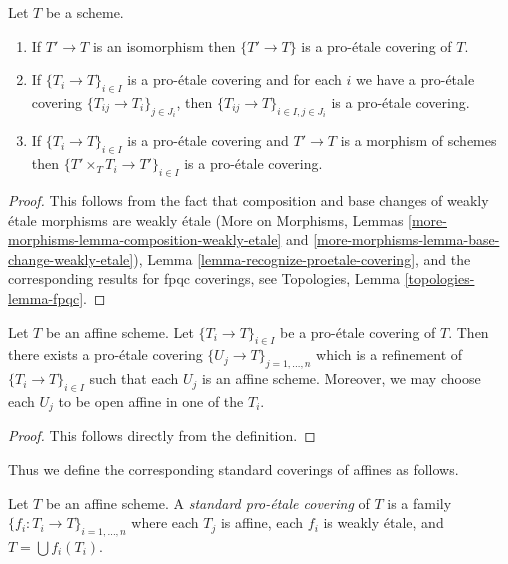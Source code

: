 \begin{lemma}
\label{lemma-proetale}
Let $T$ be a scheme.
\begin{enumerate}
\item If $T' \to T$ is an isomorphism then $\{T' \to T\}$
is a pro-\'etale covering of $T$.
\item If $\{T_i \to T\}_{i\in I}$ is a pro-\'etale covering and for each
$i$ we have a pro-\'etale covering $\{T_{ij} \to T_i\}_{j\in J_i}$, then
$\{T_{ij} \to T\}_{i \in I, j\in J_i}$ is a pro-\'etale covering.
\item If $\{T_i \to T\}_{i\in I}$ is a pro-\'etale covering
and $T' \to T$ is a morphism of schemes then
$\{T' \times_T T_i \to T'\}_{i\in I}$ is a pro-\'etale covering.
\end{enumerate}
\end{lemma}

\begin{proof}
This follows from the fact that composition and base changes
of weakly \'etale morphisms are weakly \'etale
(More on Morphisms, Lemmas
\ref{more-morphisms-lemma-composition-weakly-etale} and
\ref{more-morphisms-lemma-base-change-weakly-etale}),
Lemma \ref{lemma-recognize-proetale-covering}, and
the corresponding results for fpqc coverings, see
Topologies, Lemma \ref{topologies-lemma-fpqc}.
\end{proof}

\begin{lemma}
\label{lemma-proetale-affine}
Let $T$ be an affine scheme. Let $\{T_i \to T\}_{i \in I}$ be a pro-\'etale
covering of $T$. Then there exists a pro-\'etale covering
$\{U_j \to T\}_{j = 1, \ldots, n}$ which is a refinement
of $\{T_i \to T\}_{i \in I}$ such that each $U_j$ is an affine
scheme. Moreover, we may choose each $U_j$ to be open affine
in one of the $T_i$.
\end{lemma}

\begin{proof}
This follows directly from the definition.
\end{proof}

\noindent
Thus we define the corresponding standard coverings of affines as follows.

\begin{definition}
\label{definition-standard-proetale}
Let $T$ be an affine scheme. A {\it standard pro-\'etale covering}
of $T$ is a family $\{f_i : T_i \to T\}_{i = 1, \ldots, n}$
where each $T_j$ is affine, each $f_i$ is weakly \'etale, and
$T = \bigcup f_i(T_i)$.
\end{definition}

